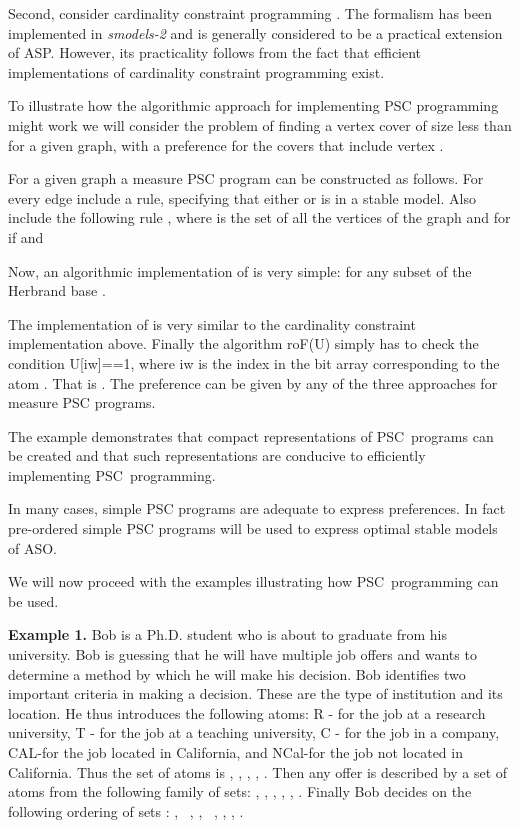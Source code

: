 \documentclass[letterpaper]{article}\usepackage{aaai}
\begin{document}
Second, consider cardinality constraint programming \cite{NSS99}. The
formalism has been implemented in \emph{smodels-2} \cite{Simons99} and is
generally considered to be a practical extension of ASP. However, its
practicality follows from the fact that efficient implementations of
cardinality constraint programming exist.

To illustrate how the algorithmic approach for implementing PSC programming
might work we will consider the problem of finding a vertex cover of size less
than  for a given graph, with a preference for the covers that include
vertex .

For a given graph a measure PSC program can be constructed as follows. For
every edge  include a rule, specifying that either  or  is in a stable
model. Also include the following rule , where  is the set of all the vertices of the graph and for
  if  and



Now, an algorithmic implementation of  is very simple: for any subset 
of the Herbrand base .

The implementation of  is very similar to the cardinality constraint
implementation above. Finally the algorithm roF(U) simply has to check the
condition U[iw]==1, where iw is the index in the bit array corresponding to
the atom . That is . The preference can be given by any of the
three approaches for measure PSC programs.

The example demonstrates that compact representations of PSC\ programs can be
created and that such representations are conducive to efficiently
implementing PSC\ programming.

\bigskip

In many cases, simple PSC programs are adequate to express preferences. In
fact pre-ordered simple PSC programs will be used to express optimal stable
models of ASO.

We will now proceed with the examples illustrating how PSC\ programming can be used.

\textbf{Example 1.}\label{Ex1} Bob is a Ph.D. student who is about to graduate
from his university. Bob is guessing that he will have multiple job offers and
wants to determine a method by which he will make his decision. Bob identifies
two important criteria in making a decision. These are the type of institution
and its location. He thus introduces the following atoms: R - for the job at a
research university, T - for the job at a teaching university, C - for the job
in a company, CAL-for the job located in California, and NCal-for the job not
located in California. Thus the set of atoms is , , , ,
. Then any offer is described by a set of atoms from the following
family of sets: ,   , , , ,
. Finally Bob decides on the following ordering of sets :
, \  ,   ,  \ ,
  ,  , .
\end{document}
